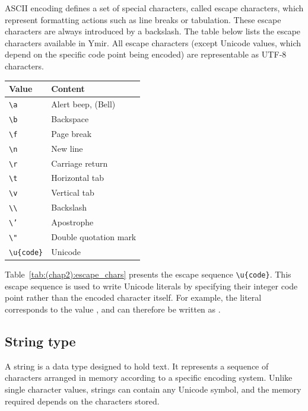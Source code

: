 ASCII encoding defines a set of special characters, called escape characters,
which represent formatting actions such as line breaks or tabulation. These
escape characters are always introduced by a backslash. The table below lists
the escape characters available in Ymir. All escape characters (except Unicode
values, which depend on the specific code point being encoded) are representable
as UTF‑8 characters.

\begin{center}
  \begin{tabular}{ll}
    Value & Content\\[0pt]
    \hline
    \texttt{\textbackslash{}a} & Alert beep, (Bell)\\[0pt]
    \texttt{\textbackslash{}b} & Backspace\\[0pt]
    \texttt{\textbackslash{}f} & Page break\\[0pt]
    \texttt{\textbackslash{}n} & New line\\[0pt]
    \texttt{\textbackslash{}r} & Carriage return\\[0pt]
    \texttt{\textbackslash{}t} & Horizontal tab\\[0pt]
    \texttt{\textbackslash{}v} & Vertical tab\\[0pt]
    \texttt{\textbackslash{}\textbackslash{}} & Backslash\\[0pt]
    \texttt{\textbackslash{}'} & Apostrophe\\[0pt]
    \texttt{\textbackslash{}"} & Double quotation mark\\[0pt]
    \texttt{\textbackslash{}u\{code\}} & Unicode\\[0pt]
  \end{tabular}
\end{center}

Table~\ref{tab:(chap2):escape_chars} presents the escape sequence
\texttt{\textbackslash{}u\{code\}}. This escape sequence is used to write
Unicode literals by specifying their integer code point rather than the encoded
character itself. For example, the literal  corresponds to the value
, and can therefore be written as .

\subsection{String type}

A string is a data type designed to hold text. It represents a sequence of
characters arranged in memory according to a specific encoding system. Unlike
single character values, strings can contain any Unicode symbol, and the memory
required depends on the characters stored.

